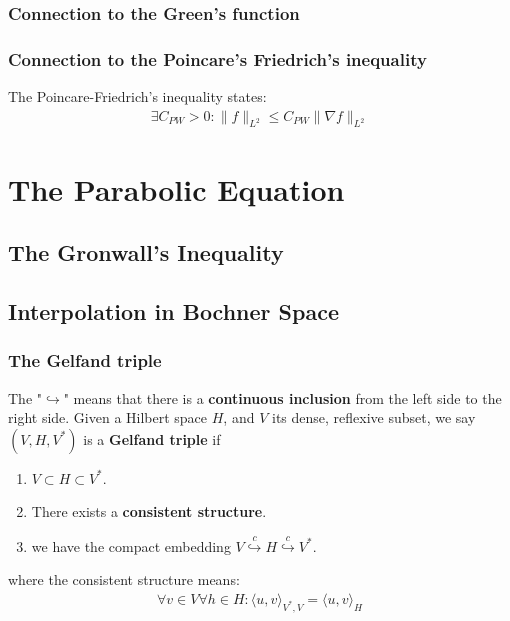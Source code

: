 \subsubsection*{Connection to the Green's function}
\subsubsection*{Connection to the Poincare's Friedrich's inequality}
The Poincare-Friedrich's inequality states:
\begin{align*}
	\exists C_{PW}>0: \| f\|_{L^2} \le C_{PW} \|\nabla f\|_{L^2}
\end{align*}




\newpage
\section{The Parabolic Equation}
\subsection{The Gronwall's Inequality}
\begin{theorem}
	
\end{theorem}


\subsection{Interpolation in Bochner Space}
 \subsubsection*{The Gelfand triple}
 The "$\hookrightarrow$" means that there is a \textbf{continuous inclusion} from the left side to the right side. Given a Hilbert space $H$, and $V$ its dense, reflexive subset, we say $(V, H, V^*)$ is a \textbf{Gelfand triple} if
 \begin{enumerate}
 	\item $V \subset H \subset V^*$. 
 	\item There exists a \textbf{consistent structure}.
 	\item we have the compact embedding $V \overset{c}{\hookrightarrow} H \overset{c}{\hookrightarrow} V^*$. 
 \end{enumerate}
 where the consistent structure means:
 \begin{align*}
 	\forall v \in V \forall h \in H: \langle u, v \rangle_{V^*, V} = \langle u, v \rangle_{H}
 \end{align*}

